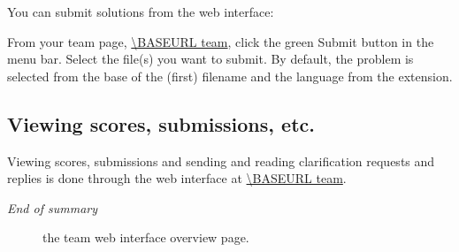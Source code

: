 You can submit solutions%
from the web interface:
\begin{description}[\breaklabel\setlabelstyle{\bfseries}]
\item[Web interface]
From your team page, \url{\BASEURL team}, click the green Submit button
in the menu bar. Select the file(s) you want to submit.
By default, the problem is selected from the base of the (first)
filename and the language from the extension.
\end{description}

\subsection*{Viewing scores, submissions, etc.}

Viewing scores, submissions and sending and reading clarification
requests and replies is done through the web interface at
\url{\BASEURL team}.

\emph{End of summary}

\begin{figure}[p]
  \centering
  \caption{the team web interface overview page.}
  \label{fig:team-overview}
\end{figure}

